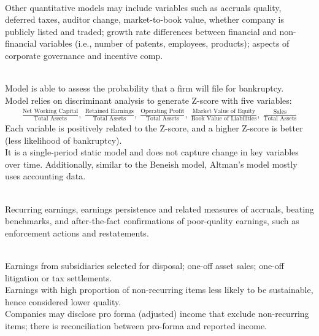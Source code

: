 \begin{remark} \\
Other quantitative models may include variables such as accruals quality, deferred taxes, auditor change, market-to-book value, whether company is publicly listed and traded; growth rate differences between financial and non-financial variables (i.e., number of patents, employees, products); aspects of corporate governance and incentive comp.
\end{remark}

\begin{method} \\
Model is able to assess the probability that a firm will file for bankruptcy.\\
Model relies on discriminant analysis to generate Z-score with five variables:
\begin{align}
\frac{\text{Net Working Capital}}{\text{Total Assets}}, \ \frac{\text{Retained Earnings}}{\text{Total Assets}}, \ \frac{\text{Operating Profit}}{\text{Total Assets}}, \  \frac{\text{Market Value of Equity}}{\text{Book Value of Liabilities}}, \ \frac{\text{Sales}}{\text{Total Assets}} \nonumber
\end{align}
Each variable is positively related to the Z-score, and a higher Z-score is better (less likelihood of bankruptcy).\\
It is a single-period static model and does not capture change in key variables over time. Additionally, similar to the Beneish model, Altman’s model mostly uses accounting data. 
\end{method}

\begin{remark} \\
Recurring earnings, earnings persistence and related measures of accruals, beating benchmarks, and after-the-fact confirmations of poor-quality earnings, such as enforcement actions and restatements.
\end{remark}

\begin{definition} \\
Earnings from subsidiaries selected for disposal; one-off asset sales; one-off litigation or tax settlements.\\
Earnings with high proportion of non-recurring items less likely to be sustainable, hence considered lower quality.\\
Companies may disclose pro forma (adjusted) income that exclude non-recurring items; there is reconciliation between pro-forma and reported income.
\end{definition}

